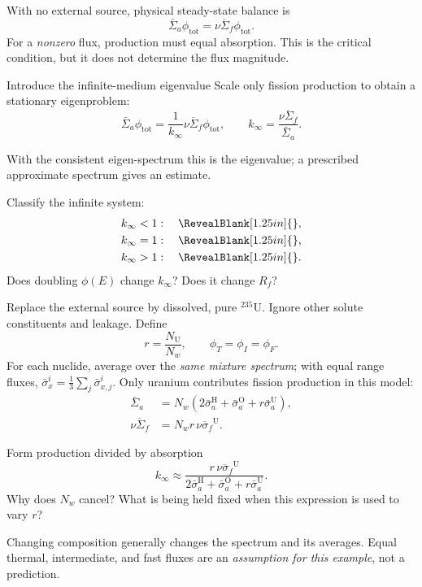 \begin{handoutcolumns}
\switchcolumn
\RaggedRight
{}
With no external source, physical steady-state balance is
\[
 \bar\Sigma_a\phi_{\mathrm{tot}}
 =\overline{\nu\Sigma_f}\phi_{\mathrm{tot}}.
\]
For a \emph{nonzero} flux, production must equal absorption.
This is the critical condition, but it does not determine the flux magnitude.
\begin{fixedbox}{Introduce the infinite-medium eigenvalue}
Scale only fission production to obtain a stationary eigenproblem:
\[
 \bar\Sigma_a\phi_{\mathrm{tot}}
 =\frac{1}{k_{\infty}}\overline{\nu\Sigma_f}\phi_{\mathrm{tot}},
 \qquad
 \boxed{k_{\infty}=\frac{\overline{\nu\Sigma_f}}{\bar\Sigma_a}}.
\]
\end{fixedbox}
With the consistent eigen-spectrum this is the eigenvalue;
a prescribed approximate spectrum gives an estimate.
\begin{checkpoint}
Classify the infinite system:
\begin{align*}
 k_{\infty}<1 &: \quad\RevealBlank[1.25in]{},\\
 k_{\infty}=1 &: \quad\RevealBlank[1.25in]{},\\
 k_{\infty}>1 &: \quad\RevealBlank[1.25in]{}.
\end{align*}
Does doubling $\phi(E)$ change $k_{\infty}$? Does it change
$R_f$?
\end{checkpoint}

Replace the external source by dissolved, pure ${}^{235}$U.
Ignore other solute constituents and leakage. Define
\[
 r=\frac{N_{\mathrm U}}{N_w},
 \qquad \phi_T=\phi_I=\phi_F.
\]
For each nuclide, average over the \emph{same mixture spectrum};
with equal range fluxes, $\bar\sigma_x^i=\frac13\sum_j\bar\sigma_{x,j}^i$.
Only uranium contributes fission production in this model:
\begin{align*}
 \bar\Sigma_a
 &=N_w\left(2\bar\sigma_a^{\mathrm H}
     +\bar\sigma_a^{\mathrm O}+r\bar\sigma_a^{\mathrm U}\right),\\
 \overline{\nu\Sigma_f}
 &=N_wr\,\overline{\nu\sigma_f}^{\mathrm U}.
\end{align*}
\begin{boardbox}{Form production divided by absorption}
\[
 \boxed{k_{\infty}\approx
 \frac{r\,\overline{\nu\sigma_f}^{\mathrm U}}
 {2\bar\sigma_a^{\mathrm H}+\bar\sigma_a^{\mathrm O}
      +r\bar\sigma_a^{\mathrm U}}}.
\]
Why does $N_w$ cancel? What is being held fixed when this
expression is used to vary $r$?
\end{boardbox}
\begin{takeawaybox}
Changing composition generally changes the spectrum and its
averages. Equal thermal, intermediate, and fast fluxes are an
\emph{assumption for this example}, not a prediction.
\end{takeawaybox}
\end{handoutcolumns}

